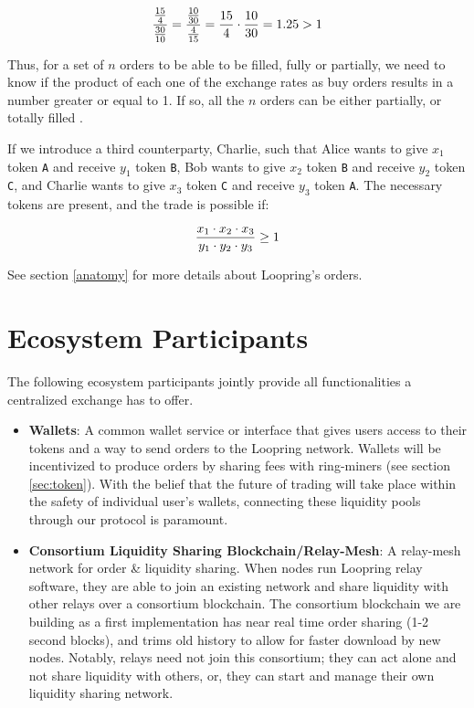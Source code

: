\documentclass[UTF8,nofonts]{article}
\begin{document}
\begin{multicols}{2}
\begin{equation}
{{15\over 4} \over {30\over 10}} = {{10\over 30} \over {4\over 15}}={15 \over 4} \cdot {10 \over 30} = 1.25 > 1
\end{equation}

Thus, for a set of $n$ orders to be able to be filled, fully or partially, we need to know if the product of each one of the exchange rates as buy orders results in a number greater or equal to 1. If so, all the $n$ orders can be either partially, or totally filled \cite{supersymmetry}.

If we introduce a third counterparty, Charlie, such that  Alice wants to give $x_1$ token \verb|A| and receive $y_1$ token \verb|B|, Bob wants to give $x_2$ token \verb|B| and receive $y_2$ token \verb|C|, and Charlie wants to give $x_3$ token \verb|C| and receive $y_3$ token \verb|A|. The necessary tokens are present, and the trade is possible if:

\begin{equation}
{{x_1 \cdot x_2 \cdot x_3 \over y_1 \cdot y_2 \cdot y_3} \geq 1}
\end{equation}


See section \ref{anatomy} for more details about Loopring's orders.



\section{Ecosystem Participants\label{sec:ecosystem}}
The following ecosystem participants jointly provide all functionalities a centralized exchange has to offer. 

\begin{itemize}

\item \textbf{Wallets}: A common wallet service or interface that gives users access to their tokens and a way to send orders to the Loopring network. Wallets will be incentivized to produce orders by sharing fees with ring-miners (see section \ref{sec:token}). With the belief that the future of trading will take place within the safety of individual user's wallets, connecting these liquidity pools through our protocol is paramount.

\item \textbf{Consortium Liquidity Sharing Blockchain/Relay-Mesh}: A relay-mesh network for order \& liquidity sharing. When nodes run Loopring relay software, they are able to join an existing network and share liquidity with other relays over a consortium blockchain. The consortium blockchain we are building as a first implementation has near real time order sharing (1-2 second blocks), and trims old history to allow for faster download by new nodes. Notably, relays need not join this consortium; they can act alone and not share liquidity with others, or, they can start and manage their own liquidity sharing network.


\end{itemize}
\end{multicols}
\end{document}
